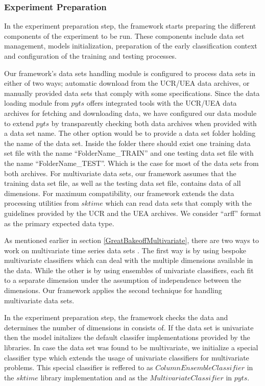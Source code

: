 \subsubsection{Experiment Preparation}
\label{SubsectionExperimentPreparation}
In the experiment preparation step, the framework starts preparing the different components of the experiment to be run.
These components include data set management, models initialization, preparation of the early classification context
and configuration of the training and testing processes.

Our framework's data sets handling module is configured to process data sets in either of two ways; automatic download from the UCR/UEA data archives,
or manually provided data sets that comply with some specifications.
Since the data loading module from $pyts$ \cite{JMLR:v21:19-763} offers integrated tools with the UCR/UEA data archives for fetching and downloading data,
we have configured our data module to extend $pyts$ by transparently checking both data archives when provided with a data set name.
The other option would be to provide a data set folder holding the name of the data set.
Inside the folder there should exist one training data set file with the name \enquote{FolderName\_TRAIN} and one testing data set file with the name \enquote{FolderName\_TEST}.
Which is the case for most of the data sets from both archives.
For multivariate data sets, our framework assumes that the training data set file, as well as the testing data set file, contains data of all dimensions.
For maximum compatibility, our framework extends the data processing utilities from $sktime$ \cite{loning2019sktime}
which can read data sets that comply with the guidelines provided by the UCR and the UEA archives.
We consider \enquote{arff} format as the primary expected data type.

As mentioned earlier in section \ref{GreatBakeoffMultivariate}, there are two ways to work on multivariate time series data sets \cite{ruiz2020great}.
The first way is by using bespoke multivariate classifiers which can deal with the multiple dimensions available in the data.
While the other is by using ensembles of univariate classifiers, each fit to a separate dimension under the assumption of independence between the dimensions.
Our framework applies the second technique for handling multivariate data sets.

In the experiment preparation step, the framework checks the data and determines the number of dimensions in consists of.
If the data set is univariate then the model initalizes the default classifer implementations provided by the libraries.
In case the data set was found to be multivariate, we initialize a special classifier type which extends the usage of univariate classifiers for multivariate problems.
This special classifier is reffered to as $ColumnEnsembleClassifier$ in the $sktime$ library implementation and as the $MultivariateClassifier$ in $pyts$.

